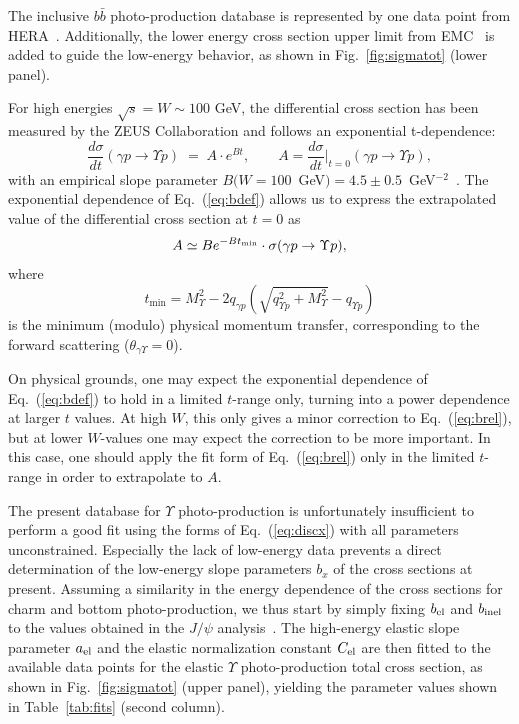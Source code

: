 \documentclass[prd,amsmath,twocolumn,floatfix,amssymb, preprintnumbers, linenumbers,nofootinbib, superscriptaddress]{revtex4}
\newcommand{\beq}{\begin{equation}}
\newcommand{\eeq}{\end{equation}}
\begin{document}
The inclusive $b \bar b$ photo-production database is represented by one data point from HERA~\cite{Adloff:1999nr}.
Additionally, the lower energy cross section upper limit from EMC~\cite{Aubert:1981gx}
is added to guide the low-energy behavior, as shown in Fig.~\ref{fig:sigmatot} (lower panel).

For high energies $\sqrt{s} = W\sim100$ GeV, the differential cross section has been measured by the ZEUS Collaboration and follows an exponential t-dependence:
\beq
\frac{d \sigma}{dt} (\gamma p \to \Upsilon p)
\;=\; A \cdot e^{Bt}, \quad \quad 
A = \frac{d \sigma}{dt} \biggr|_{t = 0} (\gamma p \to \Upsilon p) ,
\label{eq:bdef}
\eeq
with an empirical slope parameter $B(W = 100$~GeV$)=4.5\pm0.5$~GeV$^{-2}$~\cite{Chekanov:2009zz}. 
The exponential dependence of Eq.~(\ref{eq:bdef}) allows us to express the extrapolated value
 of the differential cross section at $t=0$ as
\beq
A  \simeq B e^{- B t_{\rm min}} \cdot\sigma (\gamma p \to \Upsilon p),
\label{eq:brel}
\eeq
where
\beq
t_\mathrm{min} = M_\Upsilon^2 - 2q_{\gamma p} \left(\sqrt{q_{\Upsilon p}^2 + M_\Upsilon^2} - q_{\Upsilon p}\right)
\eeq
is the minimum (modulo) physical momentum transfer, corresponding to the forward scattering ($\theta_{\gamma \Upsilon}=0$).

On physical grounds, one may expect the exponential dependence of Eq.~(\ref{eq:bdef}) to hold in a limited $t$-range only, turning into a power dependence at larger $t$ values. At high $W$, this only gives a minor correction to Eq.~(\ref{eq:brel}), but at lower $W$-values one may expect the correction to be more important. 
In this case, one should apply the fit form of Eq.~(\ref{eq:brel}) only in the limited $t$-range in order to extrapolate to $A$. 

The present database for $\Upsilon$ photo-production is unfortunately insufficient to perform a good fit using the forms of Eq.~(\ref{eq:discx}) with all parameters unconstrained.
Especially the lack of low-energy data prevents a direct determination of the low-energy slope parameters $b_x$ of the cross sections at present.
Assuming a similarity in the energy dependence of the 
cross sections for charm and bottom photo-production, 
we thus start by simply fixing $b_{\rm el}$ and 
$b_{\rm inel}$ to the values obtained in the $J/\psi$ analysis~\cite{Gryniuk:2016mpk}. 
The high-energy elastic slope parameter $a_{\rm el}$ and  
the elastic normalization constant $C_{\rm el}$ 
are then fitted to the available data points for the elastic $\Upsilon$ photo-production total cross section, as shown in Fig.~\ref{fig:sigmatot} (upper panel), yielding the parameter values shown in Table~\ref{tab:fits} (second column).  
\end{document}
